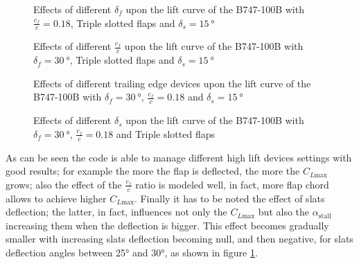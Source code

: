 %
\begin{figure}[H]
\centering

\caption{Effects of different $\delta_f$ upon the lift curve of the B747-100B with $\frac{c_f}{c}=0.18$, Triple slotted flaps and $\delta_s=\SI{15}{\degree}$}
\end{figure}
%
\begin{figure}[H]
\centering

\caption{Effects of different $\frac{c_f}{c}$ upon the lift curve of the B747-100B with $\delta_f=\SI{30}{\degree}$, Triple slotted flaps and $\delta_s=\SI{15}{\degree}$}
\end{figure}
%
\begin{figure}[H]
\centering

\caption{Effects of different trailing edge devices upon the lift curve of the B747-100B with $\delta_f=\SI{30}{\degree}$, $\frac{c_f}{c}=0.18$ and $\delta_s=\SI{15}{\degree}$}
\end{figure}
%
\begin{figure}[H]
\centering

\caption{Effects of different $\delta_s$ upon the lift curve of the B747-100B with $\delta_f=\SI{30}{\degree}$, $\frac{c_f}{c}=0.18$ and Triple slotted flaps}
\label{fig:SlatSensibility}
\end{figure}
%
\noindent
As can be seen the code is able to manage different high lift devices settings with good results; for example the more the flap is deflected, the more the $C_{L\text{max}}$ grows; also the effect of the $\frac{c_f}{c}$ ratio is modeled well, in fact, more flap chord allows to achieve higher $C_{L\text{max}}$. Finally it has to be noted the effect of slats deflection; the latter, in fact, influences not only the $C_{L\text{max}}$ but also the $\alpha_{\text{stall}}$ increasing them when the deflection is bigger. This effect becomes gradually smaller with increasing slats deflection becoming null, and then negative, for slats deflection angles between 25° and 30°, as shown in figure \ref{fig:SlatSensibility}.